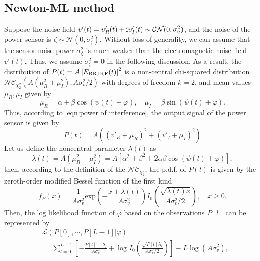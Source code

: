 \documentclass[journal,twocolumn]{IEEEtran}
\theoremstyle{nonumberplain}
\def \exp {\text{exp}}
\def \nc {\mathcal{NC}}
\def \ri {{\rm i}}
\begin{document}
\subsection{Newton-ML method}  \label{ML method}
    Suppose the noise field $v'(t)=v'_R(t) + {\ri }v'_I(t)\sim \mathcal{CN}(0, \sigma_v^2)$, and the noise of the power sensor is $\zeta \sim \mathcal{N}(0, \sigma_{\zeta}^2)$. 
    Without loss of generality, we can assume that the sensor noise power $\sigma_{\zeta}^2$ is much weaker than the electromagnetic noise field $v'(t)$.
    Thus, we assume $\sigma_{\zeta}^2=0$ in the following discussion.  
    As a result, the distribution of $P(t) = A\left|E_{{\rm BB}, {\rm IRF}}(t)\right|^2$ is a non-central chi-squared distribution $\nc_{\chi_2^2}(A(\mu_{R}^2+\mu_{I}^2),  A\sigma_v^2/2)$ with degrees of freedom $k=2$, and mean values $\mu_{R}, \mu_{I}$ given by
    \begin{equation}
        \mu_{R} = \alpha + \beta \cos(\psi(t)+\varphi),\quad  \mu_{I}  = \beta \sin(\psi(t)+\varphi).
        \label{chi2 distribution mean values}
    \end{equation}
    Thus, according to \eqref{eqn:power of interference}, the output signal of the power sensor is given by 
    \begin{equation}
        P(t)  = A\left((v'_{R} + \mu_{R})^2 + (v'_{I} + \mu_{I})^2 \right)
        \label{eqn:sensor power}
    \end{equation}
    Let us define the noncentral parameter $\lambda(t)$ as
    \begin{equation}
        \lambda(t)  = A(\mu_{R}^2 + \mu_{I}^2) = A\left[\alpha^{2}+\beta^{2}+2\alpha\beta\cos\left(\psi(t)+\varphi\right)\right],
    \end{equation}
    then, according to the definition of the $\nc_{\chi_2^2}$, the p.d.f. of $P(t)$ is given by the zeroth-order modified Bessel function of the first kind 
    \begin{equation}
        f_{P}(x) = \frac{1}{A\sigma_{v}^2} \exp\left(-\frac{x+\lambda(t)}{A\sigma_v^2}\right)I_{0}\left(\frac{\sqrt{\lambda(t) x}}{A\sigma_v^2/2}\right),\quad x \geq 0.
        \label{ML single observation}
    \end{equation}
    Then, the log likelihood function of $\varphi$ based on the observations $P[l]$ can be represented by
    \ifx\onecol\undefined
        \begin{equation}
            \begin{aligned}
                & \mathcal{L}(P[0],\cdots,P[L-1] | \varphi) \\
                & = \sum_{l=0}^{L-1}\left[-\frac{P[l] + \lambda_l}{A\sigma_v^2} + \log I_0\left(\frac{\sqrt{P[l] \lambda_l}}{A\sigma_v^2/2}\right)\right] - L\log(A\sigma_v^2),
            \end{aligned}
            \label{ML likelihood}
        \end{equation}
\end{document}
